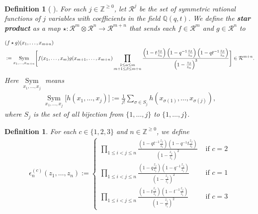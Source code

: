 \documentclass[12pt,reqno,a4paper]{amsart}
\newcommand{\cals}[1]{\mathcal{#1}}
\newcommand{\bb}[1]{\mathbb{#1}}
\numberwithin{equation}{section}
\newtheorem{dfn}[thm]{Definition}
\theoremstyle{definition}
\begin{document}
\begin{dfn}[\cite{FHHSY-comm} \cite{FHSSY-ker}]
For each $j \in \bb{Z}^{\geq 0}$, let $\cals{R}^j$ be the set of symmetric rational functions of $j$ variables with coefficients in the field $\bb{Q}(q,t)$. We define the \textbf{star product} as a map $\star : \cals{R}^m \otimes \cals{R}^n \rightarrow \cals{R}^{m+n}$ that sends each $f \in \cals{R}^m$ and $g \in \cals{R}^n$ to 

\footnotesize
\begin{align}
&(f \star g)(x_1,\dots,x_{m+n})
\\
&:= 
\underset{x_1,\dots,x_{m+n}}{\operatorname{Sym}}
\Bigg[
f(x_1,\dots,x_m)
g(x_{m+1},\dots,x_{m+n})
\prod_{
\substack{
1 \leq \alpha \leq m
\\
m+1 \leq \beta \leq m+n
}
}
\frac{
	\left(1 - t	\frac{z_\beta}{z_\alpha}		\right)
	\left(1 - q^{-1}		\frac{z_\beta}{z_\alpha}					\right)
	\left(1 - qt^{-1}			\frac{z_\beta}{z_\alpha}				\right)
}{
	\left(1 - 	\frac{z_\beta}{z_\alpha}				\right)^3
}
\Bigg]
\in 
\cals{R}^{m+n}.
\notag 
\end{align}
\normalsize 
Here $\underset{x_1,\dots,x_{j}}{\operatorname{Sym}}$ means 
\begin{align}
\underset{x_1,\dots,x_{j}}{\operatorname{Sym}}\Bigg[
h(x_1,\dots,x_j)
\Bigg]
:= 
\frac{1}{j!}\sum_{\sigma \in S_j}
h(x_{\sigma(1)},\dots,x_{\sigma(j)}),
\end{align}
where $S_j$ is the set of all bijection from $\{1,\dots,j\}$ to $\{1,\dots,j\}$. 
\end{dfn}

\begin{dfn}
For each $c \in \{1,2,3\}$ and 
$n \in \bb{Z}^{\geq 0}$, we define 
\begin{align}
	\epsilon^{(c)}_n(z_1,\dots,z_n) := 
	\begin{cases}
		\displaystyle 
		\prod_{
			1 \leq i < j \leq n 
		}
		\frac{
			\left(1 - qt^{-1}\frac{z_j}{z_i}\right)
			\left(1 - q^{-1}t\frac{z_j}{z_i}\right)
		}{
			\left(1 - \frac{z_j}{z_i}\right)^2
		}
		&\text{ if } c = 2
		\\
		\displaystyle 
		\prod_{
			1 \leq i < j \leq n 
		}
		\frac{
			\left(1 - q\frac{z_j}{z_i}\right)
			\left(1 - q^{-1}\frac{z_j}{z_i}\right)
		}{
			\left(1 - \frac{z_j}{z_i}\right)^2
		}
		&\text{ if } c = 1
		\\
		\displaystyle 
		\prod_{
			1 \leq i < j \leq n 
		}
		\frac{
			\left(1 - t\frac{z_j}{z_i}\right)
			\left(1 - t^{-1}\frac{z_j}{z_i}\right)
		}{
			\left(1 - \frac{z_j}{z_i}\right)^2
		}
		&\text{ if } c = 3 
	\end{cases}
\end{align}
\end{dfn}
\end{document}
